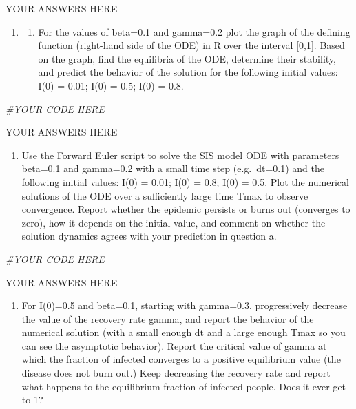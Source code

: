 \documentclass[
]{book}
\newenvironment{Shaded}{\begin{snugshade}}{\end{snugshade}}
\newcommand{\CommentTok}[1]{\textcolor[rgb]{0.56,0.35,0.01}{\textit{#1}}}
\providecommand{\tightlist}{%
  \setlength{\itemsep}{0pt}\setlength{\parskip}{0pt}}
\theoremstyle{definition}
\theoremstyle{definition}
\theoremstyle{definition}
\theoremstyle{remark}
\begin{document}
YOUR ANSWERS HERE

\begin{enumerate}
\def\labelenumi{\arabic{enumi}.}
\setcounter{enumi}{1}
\item
  \begin{enumerate}
  \def\labelenumii{\alph{enumii})}
  \tightlist
  \item
    For the values of beta=0.1 and gamma=0.2 plot the graph of the defining function (right-hand side of the ODE) in R over the interval {[}0,1{]}. Based on the graph, find the equilibria of the ODE, determine their stability, and predict the behavior of the solution for the following initial values: I(0) = 0.01; I(0) = 0.5; I(0) = 0.8.
  \end{enumerate}
\end{enumerate}

\begin{Shaded}
\begin{Highlighting}[]
\CommentTok{\#YOUR CODE HERE}
\end{Highlighting}
\end{Shaded}

YOUR ANSWERS HERE

\begin{enumerate}
\def\labelenumi{\alph{enumi})}
\setcounter{enumi}{1}
\tightlist
\item
  Use the Forward Euler script to solve the SIS model ODE with parameters beta=0.1 and gamma=0.2 with a small time step (e.g.~dt=0.1) and the following initial values: I(0) = 0.01; I(0) = 0.8; I(0) = 0.5. Plot the numerical solutions of the ODE over a sufficiently large time Tmax to observe convergence. Report whether the epidemic persists or burns out (converges to zero), how it depends on the initial value, and comment on whether the solution dynamics agrees with your prediction in question a.
\end{enumerate}

\begin{Shaded}
\begin{Highlighting}[]
\CommentTok{\#YOUR CODE HERE}
\end{Highlighting}
\end{Shaded}

YOUR ANSWERS HERE

\begin{enumerate}
\def\labelenumi{\arabic{enumi}.}
\setcounter{enumi}{2}
\tightlist
\item
  For I(0)=0.5 and beta=0.1, starting with gamma=0.3, progressively decrease the value of the recovery rate gamma, and report the behavior of the numerical solution (with a small enough dt and a large enough Tmax so you can see the asymptotic behavior). Report the critical value of gamma at which the fraction of infected converges to a positive equilibrium value (the disease does not burn out.) Keep decreasing the recovery rate and report what happens to the equilibrium fraction of infected people. Does it ever get to 1?
\end{enumerate}
\end{document}
